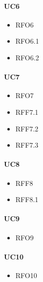 \paragraph{UC6}
\quad
\begin{multicols}{3}
    \begin{itemize}
        \item RFO6
        \item RFO6.1
        \item RFO6.2
    \end{itemize}
\end{multicols}

\paragraph{UC7}
\quad
\begin{multicols}{3}
    \begin{itemize}
        \item RFO7
        \item RFF7.1
        \item RFF7.2
        \item RFF7.3
    \end{itemize}
\end{multicols}

\paragraph{UC8}
\quad
\begin{multicols}{3}
    \begin{itemize}
        \item RFF8
        \item RFF8.1
    \end{itemize}
\end{multicols}

\paragraph{UC9}
\quad
\begin{multicols}{3}
    \begin{itemize}
        \item RFO9
    \end{itemize}
\end{multicols}

\paragraph{UC10}
\quad
\begin{multicols}{3}
    \begin{itemize}
        \item RFO10
    \end{itemize}
\end{multicols}
